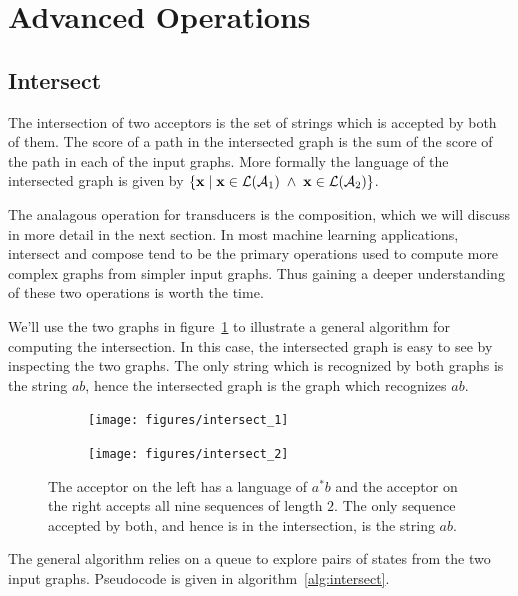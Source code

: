 \section{Advanced Operations}
\label{sec:advanced_operations}

\subsection{Intersect}

The intersection of two acceptors is the set of strings which is accepted by
both of them. The score of a path in the intersected graph is the sum of the
score of the path in each of the input graphs. More formally the language of
the intersected graph is given by $\{ {\bf x} \mid {\bf x} \in \mathcal{L}(\mathcal{A}_1) \;\land\; {\bf x}
\in \mathcal{L}(\mathcal{A}_2)\}$.

The analagous operation for transducers is the composition, which we will
discuss in more detail in the next section. In most machine learning
applications, intersect and compose tend to be the primary operations used to
compute more complex graphs from simpler input graphs. Thus gaining a deeper
understanding of these two operations is worth the time.

We'll use the two graphs in figure~\ref{fig:intersect_inputs} to illustrate a
general algorithm for computing the intersection. In this case, the intersected
graph is easy to see by inspecting the two graphs. The only string which is
recognized by both graphs is the string $ab$, hence the intersected graph is
the graph which recognizes $ab$.

\begin{figure}
    \centering
    \begin{subfigure}[b]{0.48\textwidth}
        \centering
        \texttt{[image: figures/intersect\_1]}
    \end{subfigure}
    \begin{subfigure}[b]{0.48\textwidth}
        \centering
        \texttt{[image: figures/intersect\_2]}
    \end{subfigure}
    \caption{The acceptor on the left has a language of $a^*b$ and the acceptor
    on the right accepts all nine sequences of length $2$. The only sequence
    accepted by both, and hence is in the intersection, is the string $ab$.}
    \label{fig:intersect_inputs}
\end{figure}

The general algorithm relies on a queue to explore pairs of states from the two
input graphs. Pseudocode is given in algorithm~\ref{alg:intersect}.

